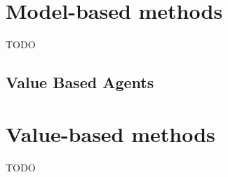 

%
%


\section{Model-based methods}
TODO

\subsection{Value Based Agents}\label{subsec:value-based-agents}


\section{Value-based methods}
TODO


